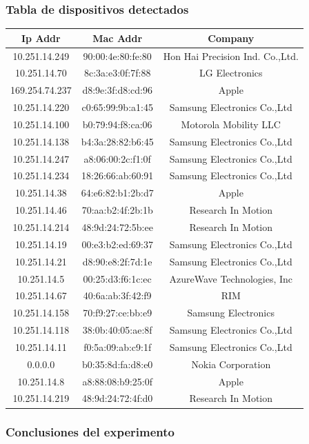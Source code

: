 \subsubsection{Tabla de dispositivos detectados}
\begin{tabular}{ |c|c|c| }
	\hline
	Ip Addr & Mac Addr & Company \\	
	\hline
	10.251.14.249 & 90:00:4e:80:fe:80 & Hon Hai Precision Ind. Co.,Ltd. \\
	\hline
	10.251.14.70 & 8c:3a:e3:0f:7f:88 & LG Electronics \\
	\hline
	169.254.74.237 & d8:9e:3f:d8:cd:96 & Apple \\
	\hline
	10.251.14.220 & c0:65:99:9b:a1:45 & Samsung Electronics Co.,Ltd \\
	\hline
	10.251.14.100 & b0:79:94:f8:ca:06 & Motorola Mobility LLC \\
	\hline
	10.251.14.138 & b4:3a:28:82:b6:45 & Samsung Electronics Co.,Ltd \\
	\hline
	10.251.14.247 & a8:06:00:2c:f1:0f & Samsung Electronics Co.,Ltd \\
	\hline
	10.251.14.234 & 18:26:66:ab:60:91 & Samsung Electronics Co.,Ltd \\
	\hline
	10.251.14.38 & 64:e6:82:b1:2b:d7 & Apple \\
	\hline
	10.251.14.46 & 70:aa:b2:4f:2b:1b & Research In Motion \\
	\hline
	10.251.14.214 & 48:9d:24:72:5b:ee & Research In Motion \\
	\hline
	10.251.14.19 & 00:e3:b2:ed:69:37 & Samsung Electronics Co.,Ltd \\
	\hline
	10.251.14.21 & d8:90:e8:2f:7d:1e & Samsung Electronics Co.,Ltd \\
	\hline
	10.251.14.5 & 00:25:d3:f6:1c:ec & AzureWave Technologies, Inc \\
	\hline
	10.251.14.67 & 40:6a:ab:3f:42:f9 & RIM \\
	\hline
	10.251.14.158 & 70:f9:27:ce:bb:e9 & Samsung Electronics \\
	\hline
	10.251.14.118 & 38:0b:40:05:ae:8f & Samsung Electronics Co.,Ltd \\
	\hline
	10.251.14.11 & f0:5a:09:ab:c9:1f & Samsung Electronics Co.,Ltd \\
	\hline
	0.0.0.0 & b0:35:8d:fa:d8:e0 & Nokia Corporation \\
	\hline
	10.251.14.8 & a8:88:08:b9:25:0f & Apple \\
	\hline
	10.251.14.219 & 48:9d:24:72:4f:d0 & Research In Motion \\
	\hline
\end{tabular}

\subsubsection{Conclusiones del experimento}
